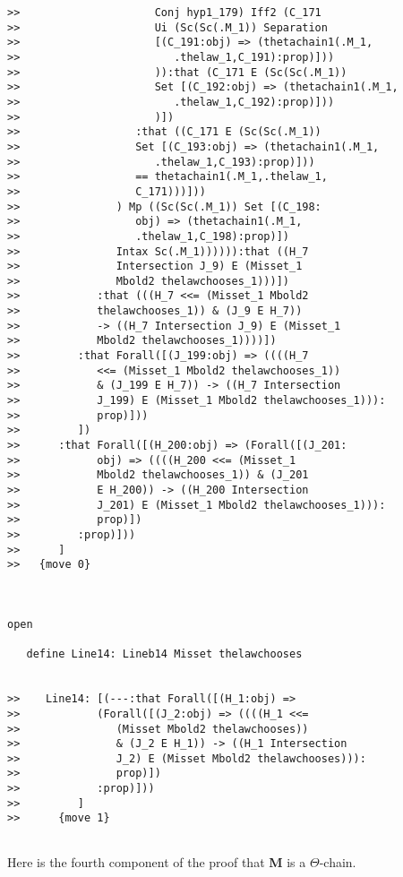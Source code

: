\documentclass[12pt]{article}
\begin{document}
\begin{verbatim}
>>                     Conj hyp1_179) Iff2 (C_171
>>                     Ui (Sc(Sc(.M_1)) Separation
>>                     [(C_191:obj) => (thetachain1(.M_1,
>>                        .thelaw_1,C_191):prop)]))
>>                     )):that (C_171 E (Sc(Sc(.M_1))
>>                     Set [(C_192:obj) => (thetachain1(.M_1,
>>                        .thelaw_1,C_192):prop)]))
>>                     )])
>>                  :that ((C_171 E (Sc(Sc(.M_1))
>>                  Set [(C_193:obj) => (thetachain1(.M_1,
>>                     .thelaw_1,C_193):prop)]))
>>                  == thetachain1(.M_1,.thelaw_1,
>>                  C_171)))]))
>>               ) Mp ((Sc(Sc(.M_1)) Set [(C_198:
>>                  obj) => (thetachain1(.M_1,
>>                  .thelaw_1,C_198):prop)])
>>               Intax Sc(.M_1)))))):that ((H_7
>>               Intersection J_9) E (Misset_1
>>               Mbold2 thelawchooses_1)))])
>>            :that (((H_7 <<= (Misset_1 Mbold2
>>            thelawchooses_1)) & (J_9 E H_7))
>>            -> ((H_7 Intersection J_9) E (Misset_1
>>            Mbold2 thelawchooses_1))))])
>>         :that Forall([(J_199:obj) => ((((H_7
>>            <<= (Misset_1 Mbold2 thelawchooses_1))
>>            & (J_199 E H_7)) -> ((H_7 Intersection
>>            J_199) E (Misset_1 Mbold2 thelawchooses_1))):
>>            prop)]))
>>         ])
>>      :that Forall([(H_200:obj) => (Forall([(J_201:
>>            obj) => ((((H_200 <<= (Misset_1
>>            Mbold2 thelawchooses_1)) & (J_201
>>            E H_200)) -> ((H_200 Intersection
>>            J_201) E (Misset_1 Mbold2 thelawchooses_1))):
>>            prop)])
>>         :prop)]))
>>      ]
>>   {move 0}



open

   define Line14: Lineb14 Misset thelawchooses


>>    Line14: [(---:that Forall([(H_1:obj) =>
>>            (Forall([(J_2:obj) => ((((H_1 <<=
>>               (Misset Mbold2 thelawchooses))
>>               & (J_2 E H_1)) -> ((H_1 Intersection
>>               J_2) E (Misset Mbold2 thelawchooses))):
>>               prop)])
>>            :prop)]))
>>         ]
>>      {move 1}


\end{verbatim}

Here is the fourth component of the proof that {\bf M} is a $\Theta$-chain.
\end{document}
